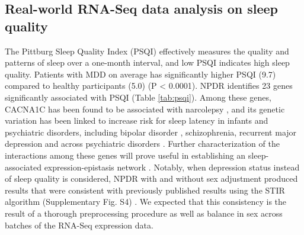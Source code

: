 \documentclass[10pt]{article}
\begin{document}
\subsection{Real-world RNA-Seq data analysis on sleep quality}
The Pittburg Sleep Quality Index (PSQI) effectively measures the quality and patterns of sleep over a one-month interval, and low PSQI indicates high sleep quality.
Patients with MDD on average has significantly higher PSQI (9.7) compared to healthy participants (5.0) (P < 0.0001).
NPDR identifies 23 genes significantly associated with PSQI (Table \ref{tab:psqi}).
Among these genes, CACNA1C has been found to be associated with narcolepsy \cite{shimada2010}, and its genetic variation has been linked to increase risk for sleep latency in infants \cite{kantojarvi2017} and psychiatric disorders, including bipolar disorder \cite{franke2010}, schizophrenia, recurrent major depression \cite{green2009} and across psychiatric disorders \cite{crossdisorder2013, lotan2014}.
Further characterization of the interactions among these genes will prove useful in establishing an sleep-associated expression-epistasis network \cite{lareau15, mckinney2009capturing}.
Notably, when depression status instead of sleep quality is considered, NPDR with and without sex adjustment produced results that were consistent with previously published results using the STIR algorithm (Supplementary Fig. S4) \cite{stir}.
We expected that this consistency is the result of a thorough preprocessing procedure as well as balance in sex across batches of the RNA-Seq expression data.
\end{document}
